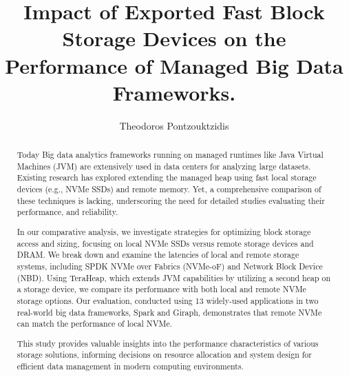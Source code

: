 \documentclass[nonacm,sigplan]{acmart}
\begin{document}
\title{Impact of Exported Fast Block Storage Devices on the Performance of Managed Big Data Frameworks.}

\author{Theodoros Pontzouktzidis} %

\begin{abstract}
\par Today Big data analytics frameworks running on managed runtimes like Java Virtual Machines (JVM) are extensively used in data centers for analyzing large datasets. Existing research has explored extending the managed heap using fast local storage devices (e.g., NVMe SSDs) and remote memory. Yet, a comprehensive comparison of these techniques is lacking, underscoring the need for detailed studies evaluating their performance, and reliability.
\par In our comparative analysis, we investigate strategies for optimizing block storage access and sizing, focusing on local NVMe SSDs versus remote storage devices and DRAM. We break down and examine the latencies of local and remote storage systems, including SPDK NVMe over Fabrics (NVMe-oF) and Network Block Device (NBD). Using TeraHeap, which extends JVM capabilities by utilizing a second heap on a storage device, we compare its performance with both local and remote NVMe storage options. Our evaluation, conducted using 13 widely-used applications in two real-world big data frameworks, Spark and Giraph, demonstrates that remote NVMe can match the performance of local NVMe. \par This study provides valuable insights into the performance characteristics of various storage solutions, informing decisions on resource allocation and system design for efficient data management in modern computing environments. 
\end{abstract}



\maketitle %
\pagestyle{plain} %









\end{document}
